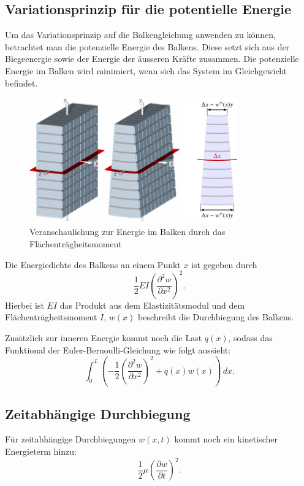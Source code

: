 \subsection{Variationsprinzip für die potentielle Energie}
Um das Variationsprinzip auf die Balkengleichung anwenden zu können, betrachtet man die potenzielle Energie des Balkens. Diese setzt sich aus der Biegeenergie sowie der Energie der äusseren Kräfte zusammen. Die potenzielle Energie im Balken wird minimiert, wenn sich das System im Gleichgewicht befindet.
\begin{figure}
	\centering
	\includegraphics[width=0.8\textwidth]{papers/balken/images/teil2/federgesetz.pdf}
	\caption{Veranschaulichung zur Energie im Balken durch das Flächenträgheitsmoment}
	\label{fig:Veranschaulichung zur Energie im Balken durch das Flächenträgheitsmoment}
\end{figure}

Die Energiedichte des Balkens an einem Punkt $x$ ist gegeben durch
\begin{equation}
	\frac{1}{2} E I \left( \frac{\partial^2 w}{\partial x^2} \right)^2.
\end{equation}
Hierbei ist $E I$ das Produkt aus dem Elastizitätsmodul und dem Flächenträgheitsmoment $I$, $w(x)$ beschreibt die Durchbiegung des Balkens.

Zusätzlich zur inneren Energie kommt noch die Last $q(x)$, sodass das Funktional der Euler-Bernoulli-Gleichung wie folgt aussieht:
\begin{equation}
	\int_0^L \left( -\frac{1}{2} \left( \frac{\partial^2 w}{\partial x^2} \right)^2 + q(x) w(x) \right) \, dx.
\end{equation}

\subsection{Zeitabhängige Durchbiegung}
Für zeitabhängige Durchbiegungen $w(x,t)$ kommt noch ein kinetischer Energieterm hinzu:
\begin{equation}
	\frac{1}{2} \mu \left( \frac{\partial w}{\partial t} \right)^2.
\end{equation}

